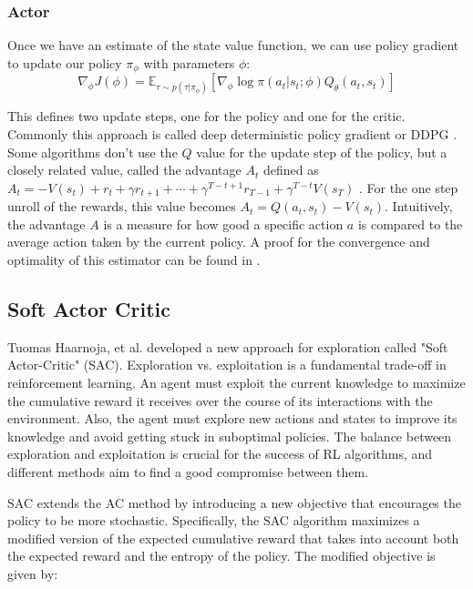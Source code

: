 \subsubsection{Actor}
Once we have an estimate of the state value function, we can use policy gradient to update our policy $\pi_{\phi}$ with parameters $\phi$:
\begin{equation}
    \label{AC_general_update}
    \nabla_{\phi} J(\phi) = \mathbb{E}_{\tau \sim p(\tau | \pi_{\phi})} \left[\nabla_{\phi} \log \pi(a_t|s_t;\phi) Q_{\theta}(a_t, s_t) \right]
\end{equation}

This defines two update steps, one for the policy and one for the critic. Commonly this approach is called deep deterministic policy gradient or DDPG \cite{lillicrap2019continuous}. 
Some algorithms don't use the $Q$ value for the update step of the policy, but a closely 
related value, called the advantage $A_t$ defined as $A_t = -V(s_t) + r_t + \gamma r_{t+1} + \cdots + \gamma^{T-t+1} r_{T-1} + \gamma^{T-t} V(s_T)$ \cite{A2C}. For the one step 
unroll of the rewards, this value becomes $A_t = Q(a_t, s_t) - V(s_t)$. 
Intuitively, the advantage $A$ is a measure for how good a specific action $a$ is compared to the average action taken by the current policy. 
A proof for the convergence and optimality of this estimator can be found in \cite{proof_A}.

\subsection{Soft Actor Critic}
\label{SAC}
Tuomas Haarnoja, et al. \cite{haarnoja2018soft} developed a new approach for exploration called "Soft Actor-Critic" (SAC). Exploration vs. exploitation 
is a fundamental trade-off in reinforcement learning. An agent must exploit the current knowledge to maximize the cumulative reward it receives 
over the course of its interactions with the environment. Also, the agent must explore new actions and states to improve its knowledge and avoid getting stuck in suboptimal policies. 
The balance between exploration and exploitation is crucial for the success of RL algorithms, and different methods aim to find a good compromise between them.

SAC extends the AC method by introducing a new objective that encourages the policy to be more stochastic. Specifically, the SAC algorithm maximizes a modified 
version of the expected cumulative reward that takes into account both the expected reward and the entropy of the policy. The modified objective is given by:

